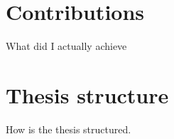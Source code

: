 






\section{Contributions}

What did I actually achieve

\section{Thesis structure}

How is the thesis structured.






